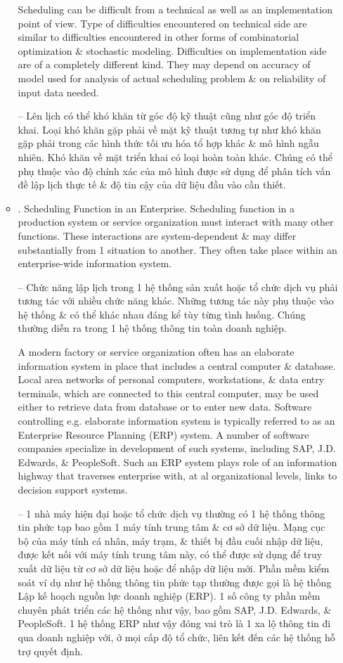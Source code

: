 \documentclass{article}
\begin{document}
\begin{itemize}
\begin{itemize}
        Scheduling can be difficult from a technical as well as an implementation point of view. Type of difficulties encountered on technical side are similar to difficulties encountered in other forms of combinatorial optimization \& stochastic modeling. Difficulties on implementation side are of a completely different kind. They may depend on accuracy of model used for analysis of actual scheduling problem \& on reliability of input data needed.

        -- Lên lịch có thể khó khăn từ góc độ kỹ thuật cũng như góc độ triển khai. Loại khó khăn gặp phải về mặt kỹ thuật tương tự như khó khăn gặp phải trong các hình thức tối ưu hóa tổ hợp khác \& mô hình ngẫu nhiên. Khó khăn về mặt triển khai có loại hoàn toàn khác. Chúng có thể phụ thuộc vào độ chính xác của mô hình được sử dụng để phân tích vấn đề lập lịch thực tế \& độ tin cậy của dữ liệu đầu vào cần thiết.
        \item {. Scheduling Function in an Enterprise.} Scheduling function in a production system or service organization must interact with many other functions. These interactions are system-dependent \& may differ substantially from 1 situation to another. They often take place within an enterprise-wide information system.

        -- Chức năng lập lịch trong 1 hệ thống sản xuất hoặc tổ chức dịch vụ phải tương tác với nhiều chức năng khác. Những tương tác này phụ thuộc vào hệ thống \& có thể khác nhau đáng kể tùy từng tình huống. Chúng thường diễn ra trong 1 hệ thống thông tin toàn doanh nghiệp.

        A modern factory or service organization often has an elaborate information system in place that includes a central computer \& database. Local area networks of personal computers, workstations, \& data entry terminals, which are connected to this central computer, may be used either to retrieve data from database or to enter new data. Software controlling e.g. elaborate information system is typically referred to as an Enterprise Resource Planning (ERP) system. A number of software companies specialize in development of such systems, including SAP, J.D. Edwards, \& PeopleSoft. Such an ERP system plays role of an information highway that traverses enterprise with, at al organizational levels, links to decision support systems.

        -- 1 nhà máy hiện đại hoặc tổ chức dịch vụ thường có 1 hệ thống thông tin phức tạp bao gồm 1 máy tính trung tâm \& cơ sở dữ liệu. Mạng cục bộ của máy tính cá nhân, máy trạm, \& thiết bị đầu cuối nhập dữ liệu, được kết nối với máy tính trung tâm này, có thể được sử dụng để truy xuất dữ liệu từ cơ sở dữ liệu hoặc để nhập dữ liệu mới. Phần mềm kiểm soát ví dụ như hệ thống thông tin phức tạp thường được gọi là hệ thống Lập kế hoạch nguồn lực doanh nghiệp (ERP). 1 số công ty phần mềm chuyên phát triển các hệ thống như vậy, bao gồm SAP, J.D. Edwards, \& PeopleSoft. 1 hệ thống ERP như vậy đóng vai trò là 1 xa lộ thông tin đi qua doanh nghiệp với, ở mọi cấp độ tổ chức, liên kết đến các hệ thống hỗ trợ quyết định.


\end{itemize}
\end{itemize}
\end{document}
